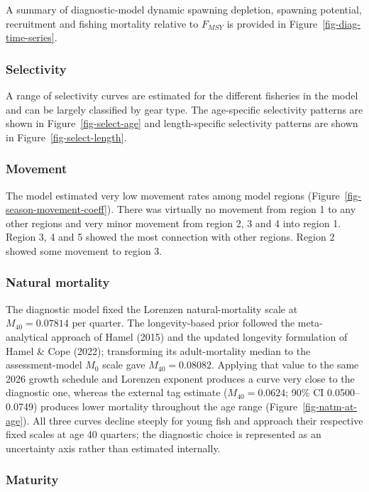\documentclass[
  english,
  a4paper,
  a4paper,
  11pt]{SCreport}
\begin{document}
A summary of diagnostic-model dynamic spawning depletion, spawning
potential, recruitment and fishing mortality relative to \(F_{MSY}\) is
provided in Figure~\ref{fig-diag-time-series}.

\subsubsection{Selectivity}\label{sec-selectivity}

A range of selectivity curves are estimated for the different fisheries
in the model and can be largely classified by gear type. The
age-specific selectivity patterns are shown in
Figure~\ref{fig-select-age} and length-specific selectivity patterns are
shown in Figure~\ref{fig-select-length}.

\subsubsection{Movement}\label{sec-movement}

The model estimated very low movement rates among model regions
(Figure~\ref{fig-season-movement-coeff}). There was virtually no
movement from region 1 to any other regions and very minor movement from
region 2, 3 and 4 into region 1. Region 3, 4 and 5 showed the most
connection with other regions. Region 2 showed some movement to region
3.

\subsubsection{Natural mortality}\label{sec-natM}

The diagnostic model fixed the Lorenzen natural-mortality scale at
\(M_{40}=0.07814\) per quarter. The longevity-based prior followed the
meta-analytical approach of Hamel (2015) and the updated longevity
formulation of Hamel \& Cope (2022); transforming its adult-mortality
median to the assessment-model \(M_0\) scale gave \(M_{40}=0.08082\).
Applying that value to the same 2026 growth schedule and Lorenzen
exponent produces a curve very close to the diagnostic one, whereas the
external tag estimate (\(M_{40}=0.0624\); 90\% CI 0.0500--0.0749)
produces lower mortality throughout the age range
(Figure~\ref{fig-natm-at-age}). All three curves decline steeply for
young fish and approach their respective fixed scales at age 40
quarters; the diagnostic choice is represented as an uncertainty axis
rather than estimated internally.

\subsubsection{Maturity}\label{sec-maturity-at-age}
\end{document}
